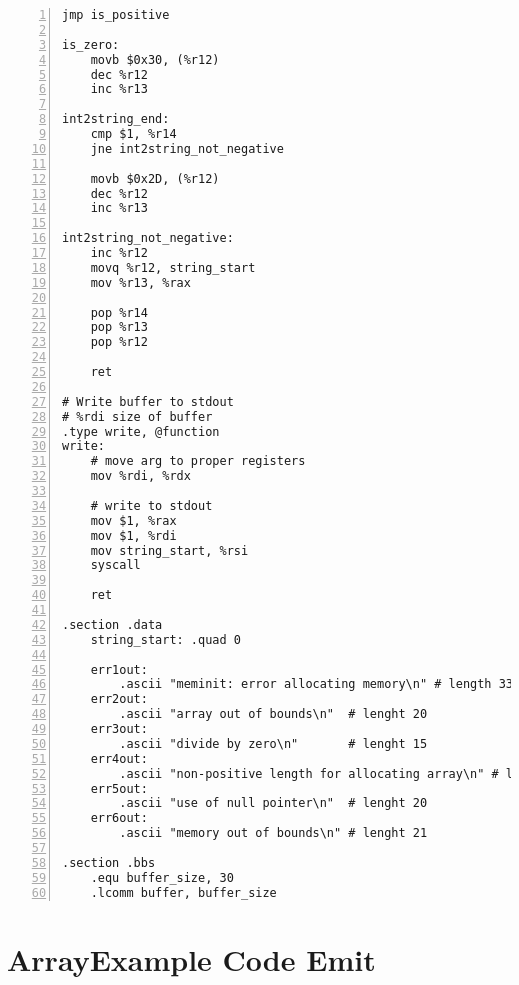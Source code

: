\documentclass{article}
\begin{document}
\begin{lstlisting}[numbers=left, firstnumber=1]
    jmp is_positive

is_zero:
    movb $0x30, (%r12)
    dec %r12
    inc %r13

int2string_end:
    cmp $1, %r14
    jne int2string_not_negative

    movb $0x2D, (%r12)
    dec %r12
    inc %r13

int2string_not_negative:
    inc %r12
    movq %r12, string_start
    mov %r13, %rax

    pop %r14
    pop %r13
    pop %r12

    ret

# Write buffer to stdout
# %rdi size of buffer
.type write, @function
write:
    # move arg to proper registers
    mov %rdi, %rdx

    # write to stdout
    mov $1, %rax
    mov $1, %rdi
    mov string_start, %rsi
    syscall

    ret

.section .data
    string_start: .quad 0

    err1out:
    	.ascii "meminit: error allocating memory\n" # length 33
    err2out:
        .ascii "array out of bounds\n"  # lenght 20
    err3out:
        .ascii "divide by zero\n"       # lenght 15
    err4out:
        .ascii "non-positive length for allocating array\n" # length 40
    err5out:
        .ascii "use of null pointer\n"  # lenght 20
    err6out:
    	.ascii "memory out of bounds\n" # lenght 21

.section .bbs
    .equ buffer_size, 30
    .lcomm buffer, buffer_size
\end{lstlisting}

\section{ArrayExample Code Emit}
\end{document}
